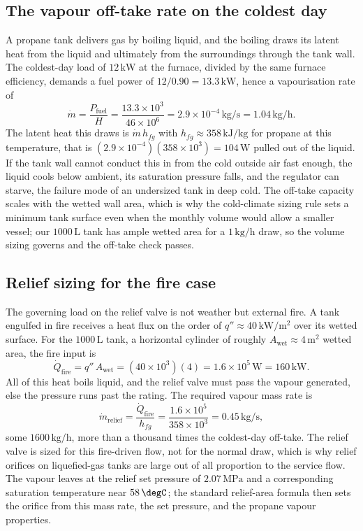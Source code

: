 



\subsection{The vapour off-take rate on the coldest day}

A propane tank delivers gas by boiling liquid, and the boiling draws its
latent heat from the liquid and ultimately from the surroundings through
the tank wall. The coldest-day load of $12\,\text{kW}$ at the furnace,
divided by the same furnace efficiency, demands a fuel power of
$12/0.90 = 13.3\,\text{kW}$, hence a vapourisation rate of
\[
\dot{m} = \frac{P_{\text{fuel}}}{H} = \frac{13.3\times 10^3}{46\times
10^6} = 2.9\times 10^{-4}\,\text{kg}/\text{s} = 1.04\,\text{kg}/\text{h}.
\]
The latent heat this draws is $\dot{m}\, h_{fg}$ with $h_{fg} \approx
358\,\text{kJ}/\text{kg}$ for propane at this temperature, that is
$(2.9\times 10^{-4})(358\times 10^3) = 104\,\text{W}$ pulled out of the
liquid. If the tank wall cannot conduct this in from the cold outside
air fast enough, the liquid cools below ambient, its saturation pressure
falls, and the regulator can starve, the failure mode of an undersized
tank in deep cold. The off-take capacity scales with the wetted wall
area, which is why the cold-climate sizing rule sets a minimum tank
surface even when the monthly volume would allow a smaller vessel; our
$1000\,\text{L}$ tank has ample wetted area for a $1\,\text{kg}/\text{h}$
draw, so the volume sizing governs and the off-take check passes.

\subsection{Relief sizing for the fire case}

The governing load on the relief valve is not weather but external fire.
A tank engulfed in fire receives a heat flux on the order of
$q'' \approx 40\,\text{kW}/\text{m}^2$ over its wetted surface. For the
$1000\,\text{L}$ tank, a horizontal cylinder of roughly $A_{\text{wet}}
\approx 4\,\text{m}^2$ wetted area, the fire input is
\[
\dot{Q}_{\text{fire}} = q''\, A_{\text{wet}} = (40\times 10^3)(4) =
1.6\times 10^5\,\text{W} = 160\,\text{kW}.
\]
All of this heat boils liquid, and the relief valve must pass the vapour
generated, else the pressure runs past the rating. The required vapour
mass rate is
\[
\dot{m}_{\text{relief}} = \frac{\dot{Q}_{\text{fire}}}{h_{fg}} =
\frac{1.6\times 10^5}{358\times 10^3} = 0.45\,\text{kg}/\text{s},
\]
some $1600\,\text{kg}/\text{h}$, more than a thousand times the
coldest-day off-take. The relief valve is sized for this fire-driven
flow, not for the normal draw, which is why relief orifices on
liquefied-gas tanks are large out of all proportion to the service
flow. The vapour leaves at the relief set pressure of $2.07\,\text{MPa}$
and a corresponding saturation temperature near $58\,\degC$; the standard
relief-area formula then sets the orifice from this mass rate, the set
pressure, and the propane vapour properties.

